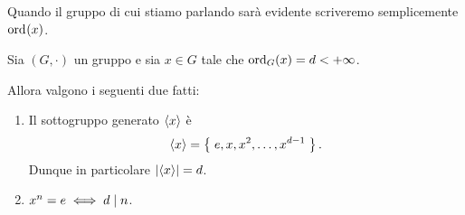 Quando il gruppo di cui stiamo parlando sarà evidente scriveremo semplicemente $\ord{x}$.

\begin{proposition}
     \label{prop:sgr_generato}
    Sia $(G, \cdot)$ un gruppo e sia $x \in G$ tale che $\ord[G]{x} = d < +\infty$. 

    Allora valgono i seguenti due fatti:
    \begin{enumerate}[label={(\roman*)}, ref={\theproposition: (\roman*)}]
        \item \label{prop:sgr_generato:expr} Il sottogruppo generato $\cycl{x}$ è \[
            \cycl{x} = \set{e, x, x^2, \dots, x^{d-1}}.    
        \] Dunque in particolare $\abs*{\cycl* x} = d$.
        \item \label{prop:sgr_generato:ord_div_n} $x^n = e \iff d \divides n$.
    \end{enumerate}
\end{proposition}
